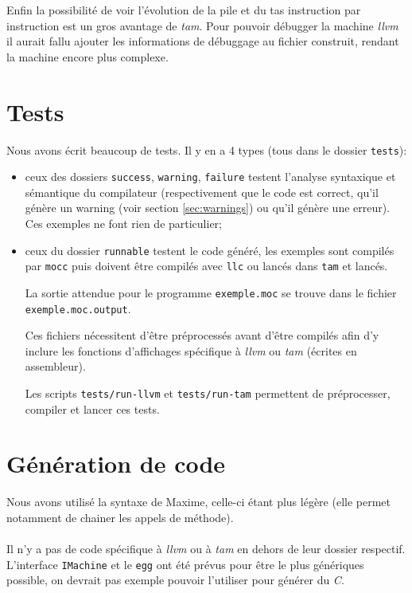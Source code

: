 \documentclass{scrartcl}
\newcommand{\egg} {\texttt{egg}}
\newcommand{\mocc}{\texttt{mocc}}
\newcommand{\llvm}{\textit{llvm}}
\newcommand{\tam} {\textit{tam}}
\begin{document}
  Enfin la possibilité de voir l'évolution de la pile et du tas instruction par
  instruction est un gros avantage de \tam{}. Pour pouvoir débugger la machine
  \llvm{} il aurait fallu ajouter les informations de débuggage au fichier
  construit, rendant la machine encore plus complexe.

\section{Tests}
  Nous avons écrit beaucoup de tests. Il y en a 4 types (tous dans le
  dossier \verb+tests+):
  \begin{itemize}
    \item ceux des dossiers \verb+success+, \verb+warning+, \verb+failure+
      testent l'analyse syntaxique et sémantique du compilateur (respectivement
      que le code est correct, qu'il génère un warning (voir section
      \ref{sec:warnings}) ou qu'il génère une erreur). Ces exemples ne font
      rien de particulier;
    \item ceux du dossier \verb+runnable+ testent le code généré, les exemples
      sont compilés par \mocc{} puis doivent être compilés avec \verb+llc+
      ou lancés dans \verb+tam+ et lancés.

      La sortie attendue pour le programme \verb+exemple.moc+ se trouve dans
      le fichier \verb+exemple.moc.output+.

      Ces fichiers nécessitent d'être préprocessés avant d'être compilés afin
      d'y inclure les fonctions d'affichages spécifique à \llvm{} ou \tam{}
      (écrites en assembleur).

      Les scripts \verb+tests/run-llvm+ et \verb+tests/run-tam+ permettent de
      préprocesser, compiler et lancer ces tests.
  \end{itemize}

\section{Génération de code}
  Nous avons utilisé la syntaxe de Maxime, celle-ci étant plus légère (elle
  permet notamment de chainer les appels de méthode).

  \paragraph{}
  Il n'y a pas de code spécifique à \llvm{} ou à \tam{} en dehors de leur
  dossier respectif. L'interface \verb+IMachine+ et le \egg{} ont été prévus
  pour être le plus génériques possible, on devrait pas exemple pouvoir
  l'utiliser pour générer du \textit{C}.
\end{document}
